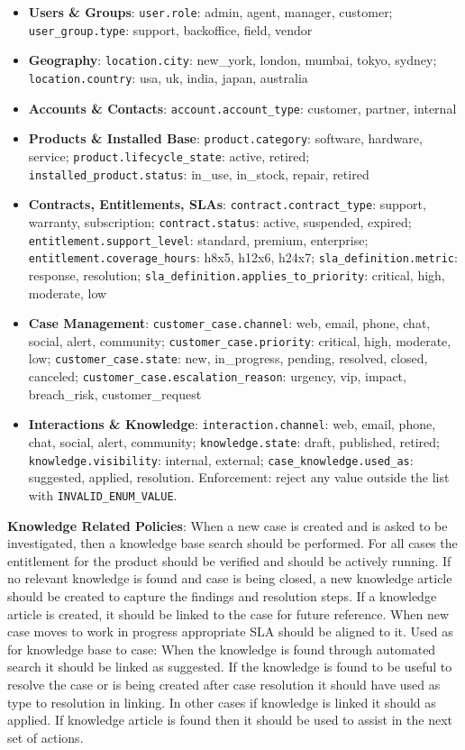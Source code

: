 \begin{taskbox}
\begin{itemize}
    \setlength\itemsep{0em}
    \item \textbf{Users \& Groups}: \texttt{user.role}: admin, agent, manager, customer; \texttt{user\_group.type}: support, backoffice, field, vendor
    \item \textbf{Geography}: \texttt{location.city}: new\_york, london, mumbai, tokyo, sydney; \texttt{location.country}: usa, uk, india, japan, australia
    \item \textbf{Accounts \& Contacts}: \texttt{account.account\_type}: customer, partner, internal
    \item \textbf{Products \& Installed Base}: \texttt{product.category}: software, hardware, service; \texttt{product.lifecycle\_state}: active, retired; \texttt{installed\_product.status}: in\_use, in\_stock, repair, retired
    \item \textbf{Contracts, Entitlements, SLAs}: \texttt{contract.contract\_type}: support, warranty, subscription; \texttt{contract.status}: active, suspended, expired; \texttt{entitlement.support\_level}: standard, premium, enterprise; \texttt{entitlement.coverage\_hours}: h8x5, h12x6, h24x7; \texttt{sla\_definition.metric}: response, resolution; \texttt{sla\_definition.applies\_to\_priority}: critical, high, moderate, low
    \item \textbf{Case Management}: \texttt{customer\_case.channel}: web, email, phone, chat, social, alert, community; \texttt{customer\_case.priority}: critical, high, moderate, low; \texttt{customer\_case.state}: new, in\_progress, pending, resolved, closed, canceled; \texttt{customer\_case.escalation\_reason}: urgency, vip, impact, breach\_risk, customer\_request
    \item \textbf{Interactions \& Knowledge}: \texttt{interaction.channel}: web, email, phone, chat, social, alert, community; \texttt{knowledge.state}: draft, published, retired; \texttt{knowledge.visibility}: internal, external; \texttt{case\_knowledge.used\_as}: suggested, applied, resolution. Enforcement: reject any value outside the list with \texttt{INVALID\_ENUM\_VALUE}.
\end{itemize}

\textbf{Knowledge Related Policies}: When a new case is created and is asked to be investigated, then a knowledge base search should be performed. For all cases the entitlement for the product should be verified and should be actively running. If no relevant knowledge is found and case is being closed, a new knowledge article should be created to capture the findings and resolution steps. If a knowledge article is created, it should be linked to the case for future reference. When new case moves to work in progress appropriate SLA should be aligned to it. Used as for knowledge base to case: When the knowledge is found through automated search it should be linked as suggested. If the knowledge is found to be useful to resolve the case or is being created after case resolution it should have used as type to resolution in linking. In other cases if knowledge is linked it should as applied. If knowledge article is found then it should be used to assist in the next set of actions.


\end{taskbox}
